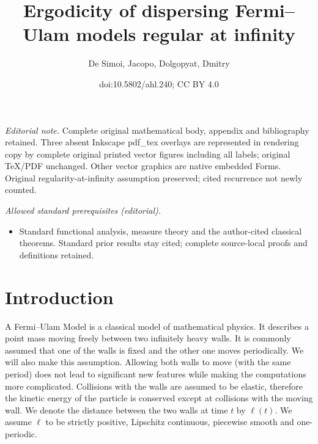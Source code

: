 \documentclass[10pt]{amsart}
\title{Ergodicity of dispersing Fermi–Ulam models regular at infinity}
\author{De Simoi, Jacopo, Dolgopyat, Dmitry}
\date{doi:10.5802/ahl.240; CC BY 4.0}
\theoremstyle{definition}\newtheorem{defi}[theo]{Definition}\newtheorem{rema}[theo]{Remark}\newtheorem{exam}[theo]{Example}\newtheorem{exem}[theo]{Example}\newtheorem{nota}[theo]{Notation}
\begin{document}
\maketitle
\noindent\textit{Editorial note.} Complete original mathematical body, appendix and bibliography retained. Three absent Inkscape pdf\_tex overlays are represented in rendering copy by complete original printed vector figures including all labels; original TeX/PDF unchanged. Other vector graphics are native embedded Forms. Original regularity-at-infinity assumption preserved; cited recurrence not newly counted.\par\medskip
\noindent\textit{Allowed standard prerequisites (editorial).}\begin{itemize}
\item Standard functional analysis, measure theory and the author-cited classical theorems. Standard prior results stay cited; complete source-local proofs and definitions retained.
\end{itemize}\medskip

\tableofcontents
\section{Introduction}
A Fermi--Ulam Model is a classical model of mathematical physics. It describes a point mass moving freely between two infinitely heavy walls. It is commonly assumed that one of the walls is fixed and the other one moves periodically. We will also make this assumption. Allowing both walls to move (with the same period) does not lead to significant new features while making the computations more complicated. Collisions with the walls are assumed to be elastic, therefore the kinetic energy of the particle is conserved except at collisions with the moving wall. We denote the distance between the two walls at time $t$ by $\ell(t)$. We assume $\ell$ to be strictly positive, Lipschitz continuous, piecewise smooth and one-periodic.
\end{document}
